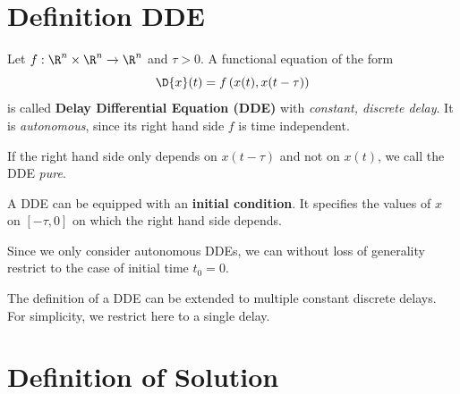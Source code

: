 

\section{Definition DDE} \label{sec:definition-dde}

\begin{definition}
    \label{definition-dde}

    Let $f:\R^n\times\R^n\rightarrow\R^n$ and $\tau > 0$.
    A functional equation of the form
    \begin{equation}
        \D{x}(t) = f\left(x(t),x(t-\tau)\right)
    \end{equation}
    is called \textbf{Delay Differential Equation (DDE)} with \emph{constant, discrete delay}. It is \emph{autonomous}, since its right hand side $f$ is time independent.

    If the right hand side only depends on $x(t-\tau)$ and not on $x(t)$, we call the DDE \emph{pure}.

    A DDE can be equipped with an \textbf{initial condition}. It specifies the values of $x$ on $[-\tau, 0]$ on which the right hand side depends.

\end{definition}

Since we only consider autonomous DDEs, we can without loss of generality restrict to the case of initial time $t_0=0$.

The definition of a DDE can be extended to multiple constant discrete delays. For simplicity, we restrict here to a single delay.

\section{Definition of Solution} \label{sec:definition-of-solution}

